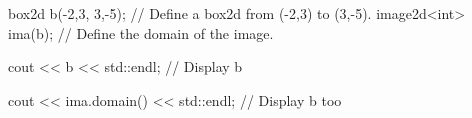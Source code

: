 box2d b(-2,3, 3,-5); // Define a box2d from (-2,3) to (3,-5).
image2d<int> ima(b); // Define the domain of the image.

cout << b << std::endl; // Display b

cout << ima.domain() << std::endl; // Display b too
